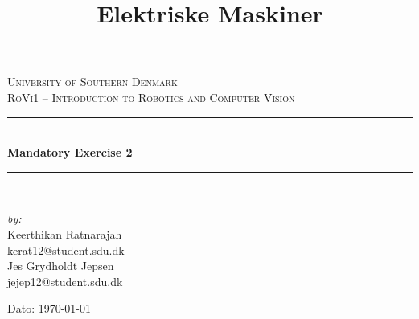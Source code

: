\documentclass[11pt]{article}
\title{Elektriske Maskiner}
\begin{document}
\begin{titlepage}
\begin{center}


\textsc{\LARGE University of Southern Denmark}\\[1.5cm]
\textsc{\Large RoVi1 -- Introduction to Robotics and Computer Vision}\\[0.5cm]
\vfill
\hrule ~\\[0.3cm]
{ \huge \bfseries Mandatory Exercise 2\\[0.4cm] }
\hrule ~\\[1.5cm]
\vfill

\begin{minipage}[t]{7.9cm}
\begin{flushleft} \large
\emph{by:}\\
Keerthikan Ratnarajah  \\
kerat12@student.sdu.dk \\
Jes Grydholdt Jepsen   \\
jejep12@student.sdu.dk 
\end{flushleft}
\end{minipage}
\begin{minipage}[t]{7.9cm}
\begin{flushright} \large

\end{flushright}
\end{minipage}

\vspace{1.2cm}
Dato: \today


\end{center}
\end{titlepage}

\tableofcontents

\newpage
\end{document}
